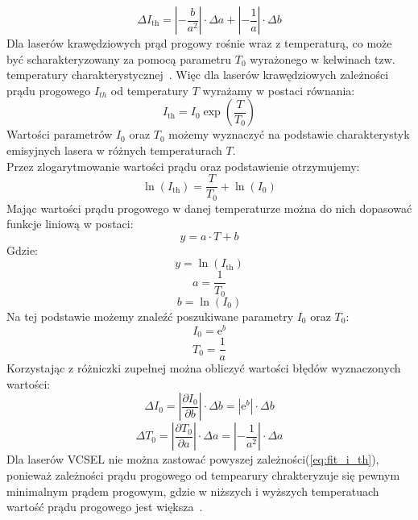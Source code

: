 \begin{equation}
\Delta I_{\mathrm{th}} = \left\lvert -\frac{b}{a^2} \right\rvert \cdot \Delta a + \left\lvert -\frac{1}{a} \right\rvert \cdot \Delta b
\end{equation}
Dla laserów krawędziowych prąd progowy rośnie wraz z temperaturą, co może być scharakteryzowany za pomocą parametru
$T_{0}$ wyrażonego w kelwinach tzw. temperatury charakterystycznej~\cite{opto_book}.
Więc dla laserów krawędziowych zależności prądu progowego $I_{th}$ od temperatury $T$ wyrażamy w postaci równania:
\begin{equation}
\label{eq:i_th}
I_{\mathrm{th}} = I_0 \exp \left( \frac{T}{T_0} \right)
\end{equation}
Wartości parametrów $I_0$ oraz $T_0$ możemy wyznaczyć na podstawie charakterystyk
emisyjnych lasera w różnych temperaturach $T$. \\
Przez zlogarytmowanie wartości prądu oraz podstawienie otrzymujemy:
\begin{equation}
\ln(I_{\mathrm{th}}) =    \frac{T}{T_0}  + \ln(I_0)
\end{equation}
Mając wartości prądu progowego w danej temperaturze  można do nich dopasować funkcje liniową w postaci:
\begin{equation}
y = a \cdot T + b
\end{equation}
Gdzie:
\begin{equation}
y = \ln(I_{\mathrm{th}})
\end{equation}
\begin{equation}
a = \frac{1}{T_0}
\end{equation}
\begin{equation}
b = \ln(I_0)
\end{equation}
Na tej podstawie możemy znaleźć poszukiwane parametry $I_0$ oraz $T_0$:
\begin{equation}
I_0 = \mathrm{e}^b
\end{equation}
\begin{equation}
T_0 = \frac{1}{a}
\end{equation}
Korzystając z różniczki zupełnej można obliczyć wartości błędów wyznaczonych wartości:
\begin{equation}
\Delta I_0 = \left\lvert \frac{\partial I_{0}}{\partial b} \right\rvert \cdot \Delta b = | \mathrm{e}^b | \cdot \Delta b
\end{equation}
\begin{equation}
\Delta T_0 = \left\lvert \frac{\partial T_{0}}{\partial a} \right\rvert \cdot \Delta a = \left\lvert -\frac{1}{a^2} \right\rvert \cdot \Delta a
\end{equation}
Dla laserów VCSEL nie można zastować powyszej zależności(\ref{eq:fit_i_th}), ponieważ zależności prądu progowego od tempearury chrakteryzuje się pewnym
 minimalnym prądem progowym, gdzie w niższych i wyższych temperatuach wartość prądu progowego jest większa~\cite{publikacja_1}.
